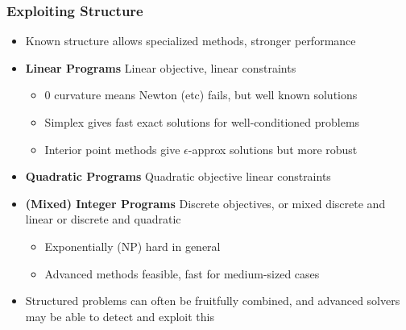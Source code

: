 \documentclass[bigger]{beamer}
\begin{document}
\begin{frame}%

\frametitle{Exploiting Structure}

\begin{itemize}

\item Known structure allows specialized methods, stronger performance

\item \textbf{Linear Programs} Linear objective, linear constraints
\begin{itemize}

\item 0 curvature means Newton (etc) fails, but well known solutions
\item Simplex gives fast exact solutions for well-conditioned problems
\item Interior point methods give $\epsilon$-approx solutions but more robust

\end{itemize}

\item \textbf{Quadratic Programs} Quadratic objective linear constraints
\item \textbf{(Mixed) Integer Programs} Discrete objectives, or mixed discrete and linear or discrete and quadratic
\begin{itemize}
\item Exponentially (NP) hard in general
\item Advanced methods feasible, fast for medium-sized cases
\end{itemize}
\item Structured problems can often be fruitfully combined, and advanced solvers may be able to detect and exploit this

\end{itemize}

\end{frame}
\end{document}
